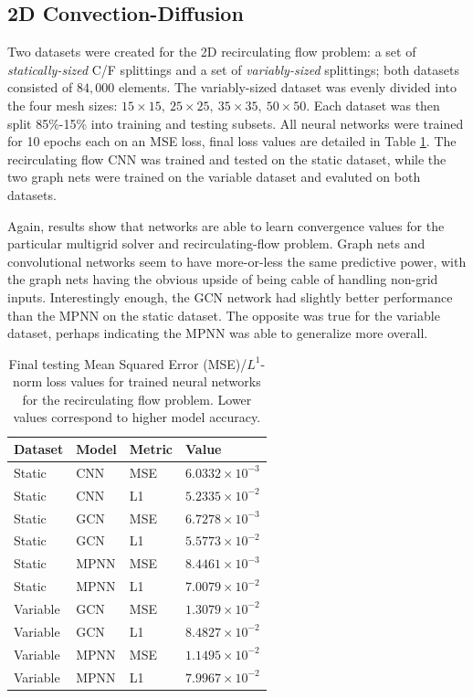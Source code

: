 \documentclass[review]{siamart190516}
\begin{document}
\subsection{2D Convection-Diffusion}

Two datasets were created for the 2D recirculating flow problem: a set of \textit{statically-sized} C/F splittings and a set of \textit{variably-sized} splittings; both datasets consisted of $84,000$ elements.  The variably-sized dataset was evenly divided into the four mesh sizes: $15\times 15,\: 25\times 25,\: 35\times 35,\: 50\times 50$.  Each dataset was then split 85\%-15\% into training and testing subsets.  All neural networks were trained for 10 epochs each on an MSE loss, final loss values are detailed in Table \ref{tab:conv_loss}.  The recirculating flow CNN was trained and tested on the static dataset, while the two graph nets were trained on the variable dataset and evaluted on both datasets.

Again, results show that networks are able to learn convergence values for the particular multigrid solver and recirculating-flow problem.  Graph nets and convolutional networks seem to have more-or-less the same predictive power, with the graph nets having the obvious upside of being cable of handling non-grid inputs.  Interestingly enough, the GCN network had slightly better performance than the MPNN on the static dataset.  The opposite was true for the variable dataset, perhaps indicating the MPNN was able to generalize more overall.

\begin{table}[t]
\centering
\begin{tabular}{|l|l|l|l|}
\hline
Dataset & Model & Metric & Value \\
\hline
Static & CNN & MSE & $6.0332 \times 10^{-3}$ \\
Static & CNN & L1 & $5.2335 \times 10^{-2}$ \\
\hline
Static & GCN & MSE & $6.7278 \times 10^{-3}$ \\
Static & GCN & L1 & $5.5773 \times 10^{-2}$ \\
\hline
Static & MPNN & MSE & $8.4461 \times 10^{-3}$ \\
Static & MPNN & L1 & $7.0079 \times 10^{-2}$ \\
\hline
Variable & GCN & MSE & $1.3079 \times 10^{-2}$ \\
Variable & GCN & L1 & $8.4827 \times 10^{-2}$ \\
\hline
Variable & MPNN & MSE & $1.1495 \times 10^{-2}$ \\
Variable & MPNN & L1 & $7.9967 \times 10^{-2}$ \\
\hline
\end{tabular}
\caption{Final testing Mean Squared Error (MSE)/$L^1$-norm loss values for trained neural networks for the recirculating flow problem.  Lower values correspond to higher model accuracy.}
\label{tab:conv_loss}
\end{table}
\end{document}
